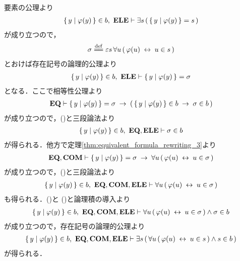 	\begin{sketch}
		要素の公理より
		\begin{align}
			\{\, y \mid \varphi(y)\, \} \in b,\ \mbox{{\bf ELE}} \vdash 
			\exists s\, (\, \{\, y \mid \varphi(y)\, \} = s\, )
		\end{align}
		が成り立つので，
		\begin{align}
			\sigma \defeq 
			\varepsilon s\, \forall u\, (\, \varphi(u) \lrarrow u \in s\, )
		\end{align}
		とおけば存在記号の論理的公理より
		\begin{align}
			\{\, y \mid \varphi(y)\, \} \in b,\ \mbox{{\bf ELE}} \vdash \{\, y \mid \varphi(y)\, \} = \sigma
			\label{fom:equivalent_formula_rewriting_9_1}
		\end{align}
		となる．ここで相等性公理より
		\begin{align}
			\mbox{{\bf EQ}} \vdash \{\, y \mid \varphi(y)\, \} = \sigma
			\hspace{0.25em}\rightarrow\hspace{0.25em} (\, \{\, y \mid \varphi(y)\, \} \in b \hspace{0.25em}\rightarrow\hspace{0.25em} \sigma \in b\, )
		\end{align}
		が成り立つので，()と三段論法より
		\begin{align}
			\{\, y \mid \varphi(y)\, \} \in b,\ \mbox{{\bf EQ}},\mbox{{\bf ELE}} \vdash \sigma \in b
			\label{fom:equivalent_formula_rewriting_9_2}
		\end{align}
		が得られる．他方で定理\ref{thm:equivalent_formula_rewriting_3}より
		\begin{align}
			\mbox{{\bf EQ}},\mbox{\bf COM} \vdash \{\, y \mid \varphi(y)\, \} = \sigma
			\hspace{0.25em}\rightarrow\hspace{0.25em} \forall u\, (\, \varphi(u) \hspace{0.25em}\leftrightarrow\hspace{0.25em} u \in \sigma\, )
		\end{align}
		が成り立つので，()と三段論法より
		\begin{align}
			\{\, y \mid \varphi(y)\, \} \in b,\ \mbox{{\bf EQ}},\mbox{\bf COM},\mbox{{\bf ELE}} \vdash
			\forall u\, (\, \varphi(u) \hspace{0.25em}\leftrightarrow\hspace{0.25em} u \in \sigma\, )
			\label{fom:equivalent_formula_rewriting_9_3}
		\end{align}
		も得られる．()と
		()と論理積の導入より
		\begin{align}
			\{\, y \mid \varphi(y)\, \} \in b,\ \mbox{{\bf EQ}},\mbox{\bf COM},\mbox{{\bf ELE}} \vdash
			\forall u\, (\, \varphi(u) \hspace{0.25em}\leftrightarrow\hspace{0.25em} u \in \sigma\, ) \wedge \sigma \in b
		\end{align}
		が成り立つので，存在記号の論理的公理より
		\begin{align}
			\{\, y \mid \varphi(y)\, \} \in b,\ \mbox{{\bf EQ}},\mbox{\bf COM},\mbox{{\bf ELE}} \vdash
			\exists s\, (\, \forall u\, (\, \varphi(u) \hspace{0.25em}\leftrightarrow\hspace{0.25em} u \in s\, ) \wedge s \in b\, )
		\end{align}
		が得られる．
		\QED
	\end{sketch}
	
